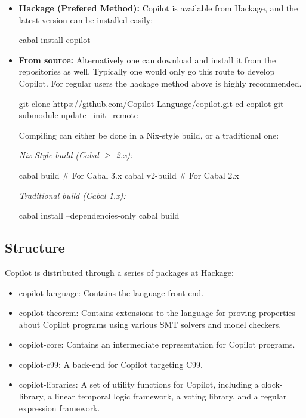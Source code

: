 \begin{itemize}
\item \textbf{Hackage (Prefered Method): } Copilot is available from Hackage,
and the latest version can be installed easily:
\begin{code}
cabal install copilot
\end{code}

\item \textbf{From source: } Alternatively one can download and install it from
the repositories as well. Typically one would only go this route to develop
Copilot. For regular users the hackage method above is highly recommended.
\begin{code}
git clone https://github.com/Copilot-Language/copilot.git
cd copilot
git submodule update --init --remote
\end{code}
Compiling can either be done in a Nix-style build, or a traditional one:

\noindent\emph{Nix-Style build (Cabal $\ge$ 2.x):}
\begin{code}
cabal build       # For Cabal 3.x
cabal v2-build    # For Cabal 2.x
\end{code}

\noindent\emph{Traditional build (Cabal 1.x):}
\begin{code}
cabal install --dependencies-only
cabal build
\end{code}
\end{itemize}


\subsection{Structure} \label{structure}

\noindent Copilot is distributed through a series of packages at Hackage:

\begin{itemize}
\item copilot-language: Contains the language front-end.
\item copilot-theorem: Contains extensions to the language for proving
properties about Copilot programs using various SMT solvers and model checkers.
\item copilot-core: Contains an intermediate representation for Copilot programs.
\item copilot-c99: A back-end for Copilot targeting C99.
\item copilot-libraries: A set of utility functions for Copilot, including a
clock-library, a linear temporal logic framework, a voting library, and a regular
expression framework.
\end{itemize}

